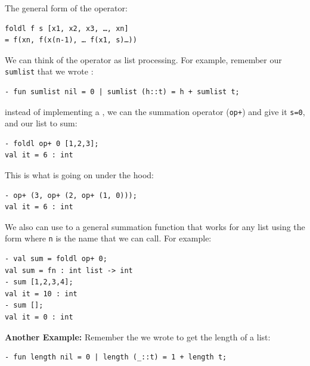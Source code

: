 The general form of the  operator:
\begin{verbatim}
foldl f s [x1, x2, x3, …, xn]
= f(xn, f(x(n-1), … f(x1, s)…))
\end{verbatim}
We can think of the  operator as  list processing. For example, remember our \texttt{sumlist} that we wrote :
\begin{verbatim}
- fun sumlist nil = 0 | sumlist (h::t) = h + sumlist t;
\end{verbatim}
instead of implementing a , we can  the summation operator (\texttt{op+}) and give it \texttt{s=0}, and our list to sum:
\begin{verbatim}
- foldl op+ 0 [1,2,3];
val it = 6 : int
\end{verbatim}
This is what is going on under the hood:
\begin{verbatim}
- op+ (3, op+ (2, op+ (1, 0)));
val it = 6 : int
\end{verbatim}

We also can use  to  a general summation function that works for any list using the form  where \texttt{n} is the name that we can call. For example:
\begin{verbatim}
- val sum = foldl op+ 0;
val sum = fn : int list -> int
- sum [1,2,3,4];
val it = 10 : int
- sum [];
val it = 0 : int
\end{verbatim}

\textbf{Another Example:}
Remember the  we wrote to get the length of a list:
\begin{verbatim}
- fun length nil = 0 | length (_::t) = 1 + length t;
\end{verbatim}

